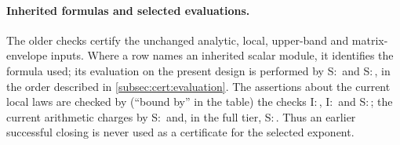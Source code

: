 \paragraph{Inherited formulas and selected evaluations.}
The older checks certify the unchanged analytic, local, upper-band and
matrix-envelope inputs. Where a row names an inherited scalar module, it
identifies the formula used; its evaluation on the present design is performed
by S:\, and S:\,, in the order described in
\cref{subsec:cert:evaluation}. The assertions about the current
local laws are checked by (``bound by'' in the table) the checks
I:\,, I:\, and
S:\,; the current arithmetic charges by
S:\, and, in the full tier,
S:\,. Thus an earlier successful closing is never used as a
certificate for the selected exponent.\par
\endgroup

